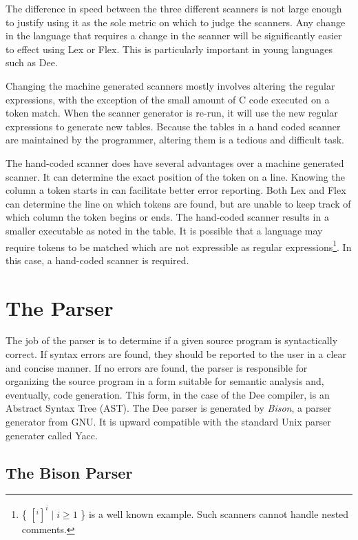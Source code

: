The difference in speed between the three different scanners is not
large enough to justify using it as the sole metric on which to judge
the scanners.  Any change in the language that requires a change in
the scanner will be significantly easier to effect using Lex or
Flex.  This is particularly important in young languages such as
Dee.  

Changing the machine generated scanners mostly involves altering the
regular expressions, with the exception of the small amount of C code
executed on a token match.  When the scanner generator is re-run, it
will use the new regular expressions to generate new tables.  Because
the tables in a hand coded scanner are maintained by the programmer,
altering them is a tedious and difficult task.

The hand-coded scanner does have several advantages over a machine
generated scanner.  It can determine the exact position of the token
on a line.  Knowing the column a token starts in can facilitate better
error reporting.  Both Lex and Flex can determine the line on which
tokens are found, but are unable to keep track of which column the
token begins or ends.  The hand-coded scanner results in a smaller
executable as noted in the table.  It is possible that a language may
require tokens to be matched which are not expressible as regular
expressions\footnote{ \{ $[^{i}]^{i} \mid i \geq 1$ \} is a well known
example.  Such scanners cannot handle nested comments.}. In this case,
a hand-coded scanner is required.

\section{The Parser}
\label{sec:parser}

The job of the parser is to determine if a given source program is
syntactically correct.  If syntax errors are found, they should be
reported to the user in a clear and concise manner.  If no errors are
found, the parser is responsible for organizing the source program in
a form suitable for semantic analysis and, eventually, code generation.
This form, in the case of the Dee compiler, is an Abstract Syntax Tree
(AST).  The Dee parser is generated by {\em Bison}, a parser generator
from GNU.  It is upward compatible with the standard Unix parser
generater called Yacc.

\subsection{The Bison Parser}

